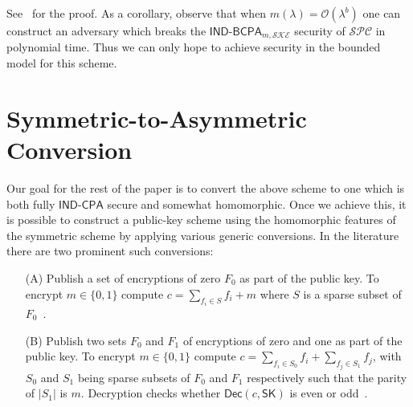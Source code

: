 \documentclass[draft]{llncs}
\newcommand{\ord}[1]{\ensuremath{\mathcal{O}\!\left(#1\right)}}
\newcommand{\SPC}{\ensuremath{\mathcal{SPC}}\xspace}
\newcommand{\SKE}{\ensuremath{\mathcal{SKE}}\xspace}
\newcommand{\secpar}{\lambda}
\newcommand{\Dec}{\mathsf{Dec}}
\newcommand{\SK}{\mathsf{SK}}
\newcommand{\IND}{\mathsf{IND}}
\newcommand{\CPA}{\mathsf{CPA}}
\newcommand{\BCPA}{\mathsf{BCPA}}
\begin{document}
See~\cite{full} for the proof. As a corollary, observe that when $m(\secpar) = \ord{\secpar^b}$ one can construct an adversary which breaks the $\IND\mbox{-}\BCPA_{m,\SKE}$ security of $\SPC$ in polynomial time. Thus we can only hope to achieve security in the bounded model for this scheme. 

\vspace{-4mm} \section{Symmetric-to-Asymmetric Conversion} \vspace{-2mm} \label{sec:conv}
Our goal for the rest of the paper is to convert the above scheme to one which is both fully $\IND\mbox{-}\CPA$ secure and somewhat homomorphic. Once we achieve this, it is possible to construct a public-key scheme using the homomorphic features of the symmetric scheme by applying various generic conversions. In the literature there are two prominent such conversions:
\begin{enumerate}
\item[(A)] Publish a set of encryptions of zero $F_0$ as part of the public key. To encrypt $m \in \{ 0,1 \}$ compute $c = \sum_{f_i \in S} f_i + m$ where $S$ is a sparse subset of $F_0$~\cite{DGHV10}.
\item[(B)] Publish two sets $F_0$ and $F_1$ of encryptions of zero and one as part of the public key. To encrypt $m \in \{ 0,1 \}$ compute $c = \sum_{f_i \in S_0} f_i + \sum_{f_j \in S_1} f_j$, with $S_0$ and $S_1$ being sparse subsets of $F_0$ and $F_1$ respectively such that the parity of $|S_1|$ is $m$. Decryption checks whether $\Dec(c,\SK)$ is even or odd~\cite{Ro10}.
\end{enumerate}
\end{document}
